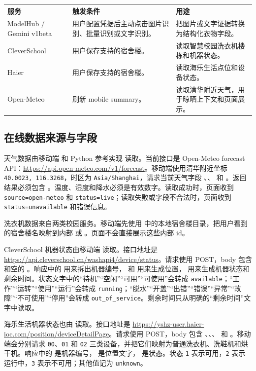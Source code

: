 \documentclass[11pt,a4paper]{ctexart}
\begin{document}
\begin{longtable}{p{} p{} p{}}
\toprule
服务 & 触发条件 & 用途 \\
\midrule
ModelHub / Gemini v1beta & 用户配置凭据后主动点击图片识别、批量识别或文字识别。 & 把图片或文字证据转换为结构化衣物字段。 \\
CleverSchool & 用户保存支持的宿舍楼。 & 读取智慧校园洗衣机楼栋和机器状态。 \\
Haier & 用户保存支持的宿舍楼。 & 读取海乐生活点位和设备状态。 \\
Open-Meteo & 刷新 mobile summary。 & 读取清华附近天气，用于晾晒上下文和页面展示。 \\
\bottomrule
\end{longtable}

\subsection{在线数据来源与字段}

天气数据由移动端  和 Python 参考实现  读取。当前接口是 Open-Meteo forecast API：\url{https://api.open-meteo.com/v1/forecast}。移动端使用清华附近坐标 \texttt{40.0023, 116.3268}，时区为 \texttt{Asia/Shanghai}，请求当前天气字段 、、 和 。返回结果必须包含 。温度、湿度和降水必须是有效数字。读取成功时，页面收到 \texttt{source=open-meteo} 和 \texttt{status=live}；读取失败或字段不合法时，页面收到 \texttt{status=unavailable} 和错误信息。

洗衣机数据来自两类校园服务。移动端先使用  中的本地宿舍楼目录，把用户看到的宿舍楼名映射到内部  或 。页面不会直接展示这些内部 id。

CleverSchool 机器状态由移动端  读取。接口地址是 \url{https://api.cleverschool.cn/washapi4/device/status}。请求使用 POST，body 包含  和空的 。响应中的  用来拆出机器编号， 和  用来生成位置， 用来生成机器状态和剩余时间。状态文字中的“待机”“空闲”“可用”“可使用”会转成 \texttt{available}；“工作”“运转”“使用”“运行”会转成 \texttt{running}；“脱水”“开盖”“出错”“错误”“异常”“故障”“不可使用”“停用”会转成 \texttt{out\_of\_service}。剩余时间只从明确的“剩余时间”文字中读取。

海乐生活机器状态也由  读取。接口地址是 \url{https://yshz-user.haier-ioc.com/position/deviceDetailPage}。请求使用 POST，body 包含 、、、 和 。移动端会分别请求 \texttt{00}、\texttt{01} 和 \texttt{02} 三类设备，并把它们映射为普通洗衣机、洗鞋机和烘干机。响应中的  是机器编号， 是位置文字， 是状态。状态 \texttt{1} 表示可用，\texttt{2} 表示运行中，\texttt{3} 表示不可用；其他值记为 \texttt{unknown}。
\end{document}
